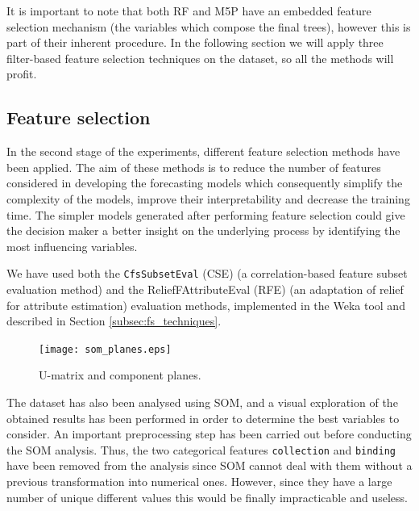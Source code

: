 \documentclass[a4paper,10pt,twocolumn,preprint,3p]{elsarticle}
\begin{document}
It is important to note that both RF and M5P have an embedded feature selection mechanism (the variables which compose the final trees), however this is part of their inherent procedure. In the following section we will apply three filter-based feature selection techniques on the dataset, so all the methods will profit.


\subsection{Feature selection}
\label{subsec:feature_selection}

In the second stage of the experiments, different feature selection methods have been applied. The aim of these methods is to reduce the number of features considered in developing the forecasting models which consequently simplify the complexity of the models, improve their interpretability and decrease the training time. The simpler models generated after performing feature selection could give the decision maker a better insight on the underlying process by identifying the most influencing variables. 
  
We have used both the {\tt CfsSubsetEval} (CSE) \cite{Hall1998} (a correlation-based feature subset evaluation method) and the ReliefFAttributeEval (RFE) \cite{RobnikSikonja1997} (an adaptation of relief for attribute estimation) evaluation methods, implemented in the Weka tool and described in Section \ref{subsec:fs_techniques}.


\begin{figure}[ht]
\begin{center}
\texttt{[image: som\_planes.eps]}
\end{center}
\caption{U-matrix and component planes.}
\label{fig:componentplanes}
\end{figure}



The dataset has also been analysed using SOM, and a visual exploration of the obtained results has been performed in order to determine the best variables to consider.
An important preprocessing step has been carried out before conducting the SOM analysis. Thus, the two categorical features \texttt{collection} and \texttt{binding} have been removed from the analysis since SOM cannot deal with them without a previous transformation into numerical ones. However, since they have a large number of unique different values this would be finally impracticable and useless. 
\end{document}
